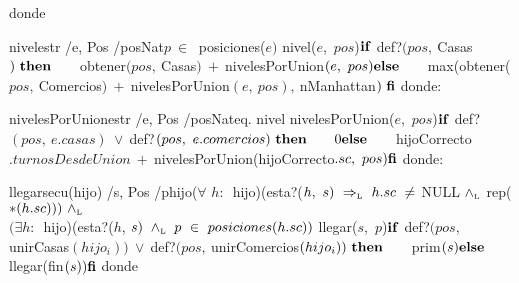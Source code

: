 
donde
\tadNoAlinearAxiomas
    
\vspace{4mm}
\tadOperacion
{nivel}{estr /e, Pos /pos}{Nat}{$p\ \in\ $ posiciones($e)$}%
\tadAxioma
{nivel($e$,\ $pos$)}{$
    \LIF\ $def?$(pos,\ $Casas$)\ \textrm{\textbf{then}}\ \\
    \hspace*{7mm} $obtener$(pos,\ $Casas$)\ +\ 
        $nivelesPorUnion$(e,\ pos) \\
    \textrm{\textbf{else}} \\ 
    \hspace*{7mm} $max(obtener($pos,\ $Comercios$)\ +\ $nivelesPorUnion$(e,\ pos),\ $nManhattan$)\\\
    \textrm{\textbf{fi}}
$}
donde:
\tadNoAlinearAxiomas

\vspace{4mm}
\tadOperacion
{nivelesPorUnion}{estr /e, Pos /pos}{Nat}{eq. nivel}            
\tadAxioma
{nivelesPorUnion($e$,\ $pos$)}{$
    \LIF\ $def?$(pos,\ e.casas)\ \vee\ $def?$(pos,\ e.comercios)\ \textrm{\textbf{then}}\ \\
    \hspace*{7mm} 0 \\
    \textrm{\textbf{else}}\ \\
    \hspace*{7mm} $hijoCorrecto$.turnosDesdeUnion\ +\ $nivelesPorUnion(hijoCorrecto$.sc,\ pos) \\
    \textrm{\textbf{fi}} 
$}
donde:
    
\vspace{4mm}
\tadOperacion
{llegar}{secu(hijo) /s, Pos /p}{hijo}{($\forall$ $h:$\ hijo)(esta?($h,\ s)\ \Rightarrow_{\mathrm{\scriptscriptstyle{L}}}\ h.sc\ \neq\ $NULL$\ \land_{\mathrm{\scriptscriptstyle{L}}}\ $rep($*(h.sc)))\ \land_{\mathrm{\scriptscriptstyle{L}}}\ $\\$ (\exists h:$\ hijo)(esta?($h$, $s)\ \yluego\ p\ \in\ posiciones(h.sc))$} 
\tadAxioma
{llegar($s$,\ $p$)}{$
    \LIF\ $def?$(pos,\ $unirCasas$(hijo_i))\ \vee\ $def?$(pos,\ $unirComercios$(hijo_i))\ \textrm{\textbf{then}}\ \\ 
    \hspace*{7mm} $prim$(s) \\ 
    \textrm{\textbf{else}}\ \\
    \hspace*{7mm} $llegar(fin$(s)) \\ 
    \textrm{\textbf{fi}}
$}
donde

